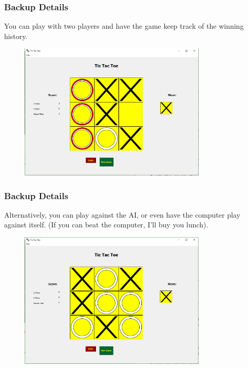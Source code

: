 \documentclass{beamer}
\begin{document}
\begin{frame}
    \frametitle{Backup Details}
    You can play with two players and have the game keep track of the winning history.
    \begin{figure}
        \centering
        \includegraphics[width=0.8\textwidth]{TicTacToe_Winner.png}
    \end{figure}
\end{frame}

\begin{frame}
    \frametitle{Backup Details}
    Alternatively, you can play against the AI, or even have the computer play against itself.  (If you can beat the computer, I'll buy you lunch).
    \begin{figure}
        \centering
        \includegraphics[width=0.8\textwidth]{TicTacToe_Computer_playing_itself.png}
    \end{figure}
\end{frame}
\end{document}
